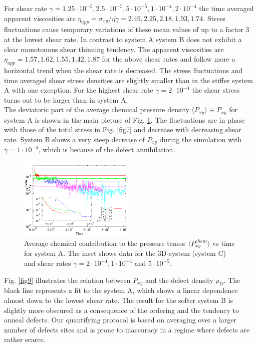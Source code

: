 \documentclass[8.5pt,twoside,twocolumn]{article}
\newcommand{\e}[1]{\cdot10^{#1}}
\newcommand{\gd}{\dot{\gamma}}
\begin{document}
For shear rate $\dot{\gamma}=1.25\e{-5}, 2.5\e{-5}, 5\e{-5}, 1\e{-4}, 2\e{-4}$ the time averaged apparent viscosities are $\eta_{app}=\sigma_{xy}/ \eta \dot{\gamma}=2.49, 2.25, 2.18, 1.93, 1.74$.
Stress fluctuations cause temporary variations of these mean values of up to a factor 3 at the lowest shear rate.
In contrast to system A system B does not exhibit a clear monotonous shear thinning tendency.
The apparent viscosities are $\eta_{app}=1.57, 1.62, 1.55, 1.42, 1.87$ for the above shear rates and follow more a horizontal trend when the shear rate is decreased.
The stress fluctuations and time averaged shear stress densities are slightly smaller than in the stiffer system A with one exception.
For the highest shear rate $\gd=2\e{-4}$ the shear stress turns out to be larger than in system A.\\
The deviatoric part of the average chemical pressure density $\langle P_{xy}\rangle\equiv P_{xy}$ for system A is shown in the main picture of Fig. \ref{fig8}.
The fluctuations are in phase with those of the total stress in Fig. \ref{fig7} and decrease with decreasing shear rate.
System B shows a very steep decrease of $P_{xy}$ during the simulation with $\gd=1\e{-4}$, which is because of the defect annihilation.\\
\begin{figure}[!]
\centering
\includegraphics[angle=0,width=0.5\textwidth]{P_xy_chem_t_5e-4.pdf}
\caption{Average chemical contribution to the pressure tensor $\langle P_{xy}^{chem}\rangle$ vs time for system A. The inset shows data for the 3D-system (system C) and shear rates $\dot{\gamma}=2\cdot10^{-4}, 1\cdot10^{-4}$ and $5\cdot10^{-5}$.}
\label{fig8}
\end{figure}
Fig. \ref{fig9} illustrates the relation between $P_{xy}$ and the defect density $\rho_D$.
The black line represents a fit to the system A, which shows a linear dependence almost down to the lowest shear rate.
The result for the softer system B is slightly more obscured as a consequence of the ordering and the tendency to anneal defects.
Our quantifying protocol is based on averaging over a larger number of defects sites and is prone to inaccuracy in a regime where defects are rather scarce.
\end{document}
